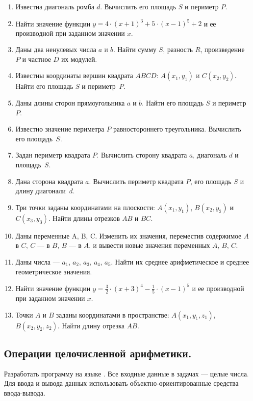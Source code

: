 \begin{enumerate}
\item Известна диагональ ромба $d$. Вычислить его площадь $S$ и периметр
$P$.

\item Найти значение функции  $y=4\cdot (x+1)^{3}+5\cdot (x-1)^{5}+2$ и ее производной при заданном значении
$x$.

\item Даны два ненулевых числа $a$ и $b$. Найти сумму $S$,
разность $R$, произведение $P$ и частное $D$ их модулей.

\item Известны координаты вершин квадрата $ABCD$:
$A(x_1,y_1)$ и $C(x_2,y_2)$. Найти его площадь $S$ и периметр~$P$.

\item Даны длины сторон прямоугольника $a$ и $b$. Найти его площадь
$S$ и периметр~$P$.

\item Известно значение периметра $P$ равностороннего треугольника. Вычислить его площадь~$S$.

\item Задан периметр квадрата $P$. Вычислить сторону квадрата $a$, диагональ
$d$ и площадь~$S$.

\item Дана сторона квадрата $a$. Вычислить периметр квадрата $P$, его площадь
$S$ и длину диагонали~$d$.

\item Три точки заданы координатами на плоскости:
$A(x_1,y_1)$, $B(x_2,y_2)$ и $C(x_3,y_3)$. Найти длины
отрезков $AB$ и $BC$.

\item Даны переменные A, B, C. Изменить их значения, переместив содержимое $A$ в
$C$, $C$ --- в $B$, $B$ --- в
$A$, и вывести новые значения переменных $A$, $B$,
$C$.

\item Даны числа --- $a_1$, $a_2$, $a_3$, $a_4$, $a_5$.
Найти их среднее арифметическое и среднее геометрическое значения.

\item Найти значение функции  $y=\frac{3}{2}\cdot (x+3)^{4}-\frac{1}{5}\cdot (x-1)^{5}$  и ее производной при заданном
значении $x$.

\item Точки $A$ и $B$ заданы координатами в пространстве:
$A(x_1, y_1, z_1)$, $B(x_2, y_2, z_2)$. Найти длину отрезка $AB$.
\end{enumerate}

\subsection[Операции целочисленной арифметики.]{Операции целочисленной арифметики.}
Разработать программу на языке . Все входные данные в задачах --- {целые числа}. Для ввода и вывода
данных использовать объектно-ориентированные средства ввода-вывода.

